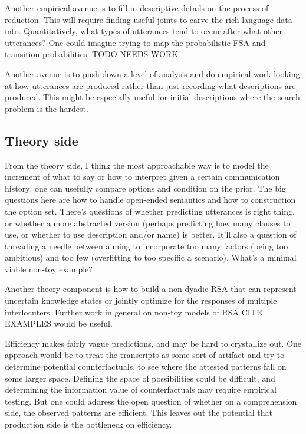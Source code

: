 \documentclass[]{article}
\begin{document}
	Another empirical avenue is to fill in descriptive details on the process of reduction. This will require finding useful joints to carve the rich language data into. Quantitatively, what types of utterances tend to occur after what other utterances? One could imagine trying to map the probabilistic FSA and transition probabilities. TODO NEEDS WORK 
	
	Another avenue is to push down a level of analysis and do empirical work looking at how utterances are produced rather than just recording what descriptions are produced. This might be especially useful for initial descriptions where the search problem is the hardest. 
	
	\subsection{Theory side}
	
	From the theory side, I think the most approachable way is to model the increment of what to say or how to interpret given a certain communication history: one can usefully compare options and condition on the prior. The big questions here are how to handle open-ended semantics and how to construction the option set. There's questions of whether predicting utterances is right thing, or whether a more abstracted version (perhaps predicting how many clauses to use, or whether to use description and/or name) is better. 	It'll also a question of threading a needle between aiming to incorporate too many factors (being too ambitious) and too few (overfitting to too specific a scenario). What's a minimal viable non-toy example? 
	
	Another theory component is how to build a non-dyadic RSA that can represent uncertain knowledge states or jointly optimize for the responses of multiple interlocuters. Further work in general on non-toy models of RSA CITE EXAMPLES would be useful. 
	
	Efficiency makes fairly vague predictions, and may be hard to crystallize out. One approach would be to treat the transcripts as some sort of artifact and try to determine potential counterfactuals, to see where the attested patterns fall on some larger space. Defining the space of possibilities could be difficult, and determining the information value of counterfactuals may require empirical testing. But one could address the open question of whether on a comprehension side, the observed patterns are efficient. This leaves out the potential that production side is the bottleneck on efficiency.  
	
\end{document}
